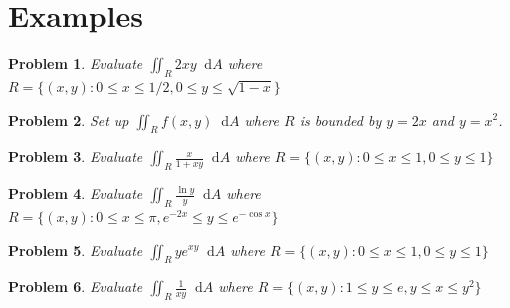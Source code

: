 \documentclass[11pt]{article}
\newtheorem{problem}{Problem}
\newcommand*\dif{\mathop{}\!\mathrm{d}}
\begin{document}
\section{Examples}

\begin{problem}
    Evaluate $\iint_R 2xy \dif{A}$ where $R = \{(x,y) : 0 \leq x \leq 1/2, 0 \leq y \leq \sqrt{1-x}\}$
\end{problem}

\vspace{5cm}


\begin{problem}
    Set up $\iint_R f(x,y) \dif{A}$ where $R$ is bounded by $y= 2x$ and $y = x^2$.
\end{problem}


\vspace{6 cm}



\begin{problem}
    Evaluate $\iint_R \frac{x}{1+xy} \dif{A}$ where $R = \{(x,y) : 0 \leq x \leq 1, 0 \leq y \leq 1\}$
\end{problem}


\vspace{6.5cm}



\begin{problem}
    Evaluate $\iint_R \frac{\ln{y}}{y} \dif{A}$ where $R = \{(x,y) : 0 \leq x \leq \pi, e^{-2x} \leq y \leq e^{-\cos{x}}\}$
\end{problem}

\vspace{6.5cm}





\begin{problem}
    Evaluate $\iint_R ye^{xy} \dif{A}$ where $R = \{(x,y) : 0 \leq x \leq 1, 0 \leq y \leq 1\}$
\end{problem}


\vspace{6.5cm}





\begin{problem}
    Evaluate $\iint_R \frac{1}{xy} \dif{A}$ where $R = \{(x,y) : 1 \leq y \leq e, y \leq x \leq y^2\}$
\end{problem}


\vspace{6.5cm}
\end{document}
